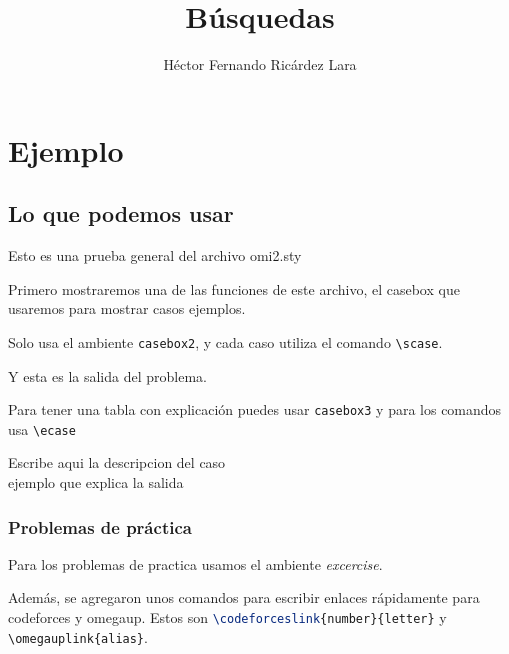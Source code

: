 \documentclass[b5paper,12pt]{book}
\begin{document}
	
	\author{Héctor Fernando Ricárdez Lara}
	\title{Búsquedas}
	\date{}
	
	\frontmatter
	\maketitle
	
	\tableofcontents
	
	
	\mainmatter
	\part{Ejemplo}

	\chapter{Lo que podemos usar}
	Esto es una prueba general del archivo omi2.sty
	
	Primero mostraremos una de las funciones de este archivo, el casebox que usaremos para mostrar casos ejemplos.
	
	Solo usa el ambiente \lstinline|casebox2|, y cada caso utiliza el comando \lstinline|\scase|.
	
	\begin{casebox2}
		 {
			Y esta es la salida del problema.
		}
	\end{casebox2}

	Para tener una tabla con explicación puedes usar \lstinline|casebox3| y para los comandos usa \lstinline|\ecase|
	
	\begin{casebox3}
		 {
			Escribe aqui la descripcion del caso \\
			ejemplo que explica la salida
		}
	\end{casebox3}
	
	\section{Problemas de práctica}
	
	Para los problemas de practica usamos el ambiente \textit{excercise}.
	
	Además, se agregaron unos comandos para escribir enlaces rápidamente para codeforces y omegaup. Estos son \lstinline[language=tex]|\codeforceslink{number}{letter}| y \lstinline|\omegauplink{alias}|.
	
\end{document}

